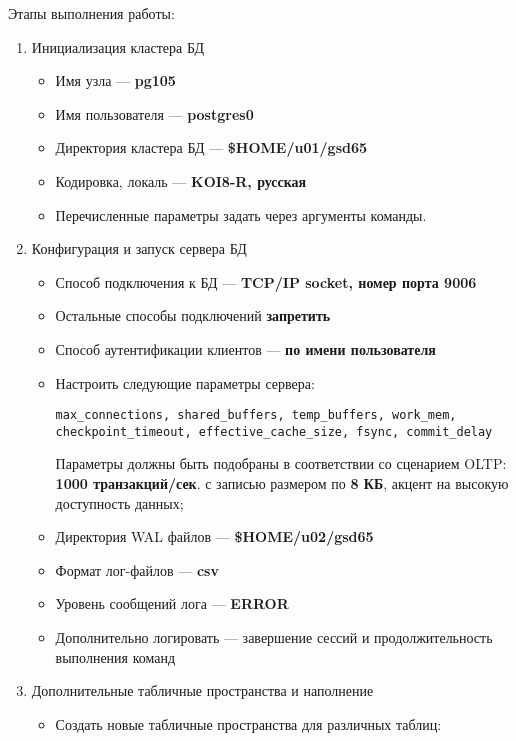 \documentclass{article}
\begin{document}
Этапы выполнения работы:
\begin{enumerate}
    \item Инициализация кластера БД
          \begin{itemize}
              \item Имя узла — \textbf{pg105}
              \item Имя пользователя — \textbf{postgres0}
              \item Директория кластера БД — \textbf{\$HOME/u01/gsd65}
              \item Кодировка, локаль — \textbf{KOI8-R, русская}
              \item Перечисленные параметры задать через аргументы команды.
          \end{itemize}
    \item Конфигурация и запуск сервера БД
          \begin{itemize}
              \item Способ подключения к БД — \textbf{TCP/IP socket, номер порта 9006}
              \item Остальные способы подключений \textbf{запретить}
              \item Способ аутентификации клиентов — \textbf{по имени пользователя}
              \item Настроить следующие параметры сервера: \begin{verbatim}
max_connections, shared_buffers, temp_buffers, work_mem,
checkpoint_timeout, effective_cache_size, fsync, commit_delay\end{verbatim}
               Параметры должны быть подобраны в соответствии со сценарием OLTP: \textbf{1000 транзакций/сек}. с записью размером по \textbf{8 КБ}, акцент на высокую доступность данных;
              \item Директория WAL файлов — \textbf{\$HOME/u02/gsd65}
              \item Формат лог-файлов — \textbf{csv}
              \item Уровень сообщений лога — \textbf{ERROR}
              \item Дополнительно логировать — завершение сессий и продолжительность
выполнения команд
          \end{itemize}
    \item Дополнительные табличные пространства и наполнение
          \begin{itemize}
              \item Создать новые табличные пространства для различных таблиц:

\end{itemize}
\end{enumerate}
\end{document}
